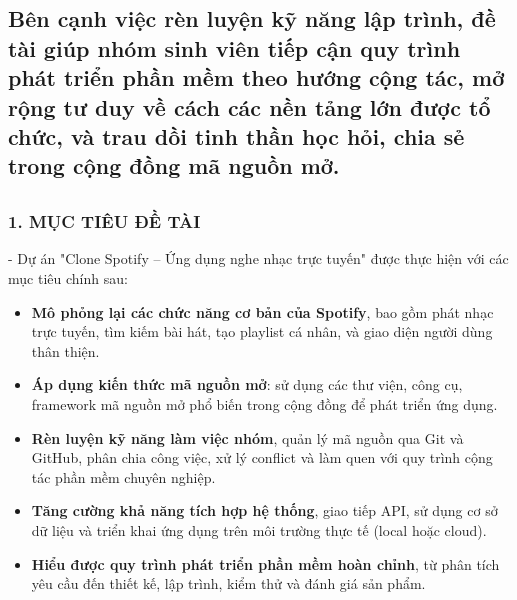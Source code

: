 \documentclass{article}
\begin{document}
\subsection{Bên cạnh việc rèn luyện kỹ năng lập trình, đề tài giúp nhóm
sinh viên tiếp cận quy trình phát triển phần mềm theo hướng cộng tác, mở
rộng tư duy về cách các nền tảng lớn được tổ chức, và trau dồi tinh thần
học hỏi, chia sẻ trong cộng đồng mã nguồn
mở.}\label{buxean-cux1ea1nh-viux1ec7c-ruxe8n-luyux1ec7n-kux1ef9-nux103ng-lux1eadp-truxecnh-ux111ux1ec1-tuxe0i-giuxfap-nhuxf3m-sinh-viuxean-tiux1ebfp-cux1eadn-quy-truxecnh-phuxe1t-triux1ec3n-phux1ea7n-mux1ec1m-theo-hux1b0ux1edbng-cux1ed9ng-tuxe1c-mux1edf-rux1ed9ng-tux1b0-duy-vux1ec1-cuxe1ch-cuxe1c-nux1ec1n-tux1ea3ng-lux1edbn-ux111ux1b0ux1ee3c-tux1ed5-chux1ee9c-vuxe0-trau-dux1ed3i-tinh-thux1ea7n-hux1ecdc-hux1ecfi-chia-sux1ebb-trong-cux1ed9ng-ux111ux1ed3ng-muxe3-nguux1ed3n-mux1edf.}

\subsection{}\label{section}

\subsubsection{\texorpdfstring{\textbf{1. MỤC TIÊU ĐỀ
TÀI}}{1. MỤC TIÊU ĐỀ TÀI}}\label{mux1ee5c-tiuxeau-ux111ux1ec1-tuxe0i}

- Dự án "Clone Spotify -- Ứng dụng nghe nhạc trực tuyến" được thực hiện
với các mục tiêu chính sau:

\begin{itemize}
\item
  \textbf{Mô phỏng lại các chức năng cơ bản của Spotify}, bao gồm phát
  nhạc trực tuyến, tìm kiếm bài hát, tạo playlist cá nhân, và giao diện
  người dùng thân thiện.
\item
  \textbf{Áp dụng kiến thức mã nguồn mở}: sử dụng các thư viện, công cụ,
  framework mã nguồn mở phổ biến trong cộng đồng để phát triển ứng dụng.
\item
  \textbf{Rèn luyện kỹ năng làm việc nhóm}, quản lý mã nguồn qua Git và
  GitHub, phân chia công việc, xử lý conflict và làm quen với quy trình
  cộng tác phần mềm chuyên nghiệp.
\item
  \textbf{Tăng cường khả năng tích hợp hệ thống}, giao tiếp API, sử dụng
  cơ sở dữ liệu và triển khai ứng dụng trên môi trường thực tế (local
  hoặc cloud).
\item
  \textbf{Hiểu được quy trình phát triển phần mềm hoàn chỉnh}, từ phân
  tích yêu cầu đến thiết kế, lập trình, kiểm thử và đánh giá sản phẩm.
\end{itemize}
\end{document}
